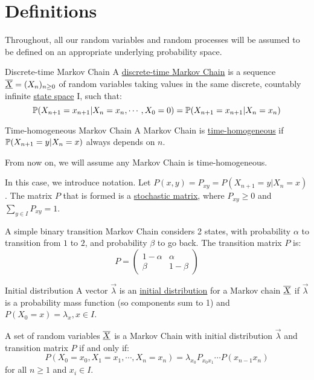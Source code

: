 \documentclass[../Main.tex]{subfiles}
\begin{document}
\section{Definitions}
Throughout, all our random variables and random processes will be assumed to be defined on an appropriate underlying probability space.

\begin{definition}{Discrete-time Markov Chain}
    A \underline{discrete-time Markov Chain} is a sequence $\chain{X} = (X_n)_{n \geq 0}$ of random variables taking values in the same discrete, countably infinite \underline{state space} I, such that:
    \begin{equation*}
        \P(X_{n+1} = x_{n + 1} | X_n = x_n, \cdots, X_0 = 0) = \P(X_{n+1} = x_{n + 1} | X_n = x_n)
    \end{equation*}
\end{definition}
\begin{definition}{Time-homogeneous Markov Chain}
    A Markov Chain is \underline{time-homogeneous} if $\P(X_{n+1} = y | X_n = x)$ always depends on $n$.
\end{definition}
From now on, we will assume any Markov Chain is time-homogeneous.

In this case, we introduce notation. Let $P(x, y) = P_{xy} = P(X_{n + 1} = y | X_n = x)$. The matrix $P$ that is formed is a \underline{stochastic matrix}, where $P_{xy} \geq 0$ and $\sum_{y \in I} P_{xy} = 1$.

\begin{example}
    A simple binary transition Markov Chain considers 2 states, with probability $\alpha$ to transition from $1$ to $2$, and probability $\beta$ to go back. The transition matrix $P$ is:
    \begin{equation*}
        P = 
        \begin{pmatrix}
            1 - \alpha & \alpha \\
            \beta & 1 - \beta
        \end{pmatrix}
    \end{equation*}
\end{example}
\begin{definition}{Initial distribution}
    A vector $\vec{\lambda}$ is an \underline{initial distribution} for a Markov chain $\chain{X}$ if $\vec{\lambda}$ is a probability mass function (so components sum to 1) and $P(X_0 = x) = \lambda_x, x \in I$.
\end{definition}
\begin{theorem}
    A set of random variables $\chain{X}$ is a Markov Chain with initial distribution $\vec{\lambda}$ and transition matrix $P$ if and only if:
    \begin{equation*}
        P(X_0 = x_0, X_1 = x_1, \cdots, X_n = x_n) = \lambda_{x_0} P_{x_0 x_1} \cdots P(x_{n-1} x_n)
    \end{equation*}
    for all $n \geq 1$ and $x_i \in I$.
    \label{thmMarkovPathEquivalence}
\end{theorem}
\end{document}
